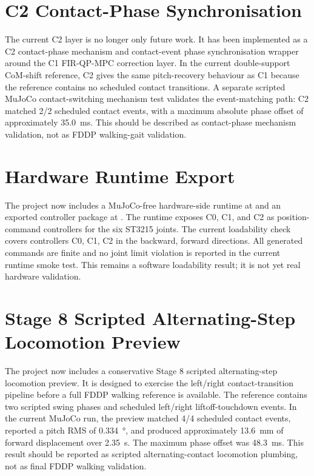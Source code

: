 
\section{C2 Contact-Phase Synchronisation}
The current C2 layer is no longer only future work. It has been implemented as
a C2 contact-phase mechanism and contact-event phase synchronisation wrapper around the C1 FIR-QP-MPC
correction layer. In the current double-support CoM-shift reference, C2 gives
the same pitch-recovery behaviour as C1 because the reference contains no
scheduled contact transitions. A separate scripted MuJoCo contact-switching
mechanism test validates the event-matching path: C2 matched 2/2 scheduled contact events, with a
maximum absolute phase offset of approximately
\SI{35.0}{\milli\second}.
This should be described as contact-phase mechanism validation, not as FDDP
walking-gait validation.

\section{Hardware Runtime Export}
The project now includes a MuJoCo-free hardware-side runtime at
 and an exported
controller package at . The
runtime exposes C0, C1, and C2 as position-command controllers for the six
ST3215 joints. The current loadability check covers controllers C0, C1, C2
in the backward, forward directions. All generated commands are finite and no joint
limit violation is reported in the current runtime smoke test. This remains a
software loadability result; it is not yet real hardware validation.

\section{Stage 8 Scripted Alternating-Step Locomotion Preview}
The project now includes a conservative Stage 8 scripted alternating-step
locomotion preview. It is designed to exercise the left/right contact-transition
pipeline before a full FDDP walking reference is available. The reference
contains two scripted swing phases and scheduled left/right liftoff-touchdown
events. In the current MuJoCo run, the preview matched 4/4 scheduled contact events,
reported a pitch RMS of \SI{0.334}{\degree},
and produced approximately \SI{13.6}{\milli\metre}
of forward displacement over \SI{2.35}{\second}.
The maximum phase offset was \SI{48.3}{\milli\second}.
This result should be reported as scripted alternating-contact locomotion
plumbing, not as final FDDP walking validation.

